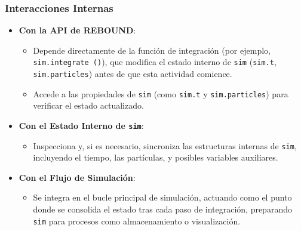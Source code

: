 \subsubsection{Interacciones Internas}
\begin{itemize}
    \item \textbf{Con la API de REBOUND}:
    \begin{itemize}
        \item Depende directamente de la función de integración (por ejemplo, \texttt{sim.integrate~()}), que modifica el estado interno de \texttt{sim} (\texttt{sim.t}, \texttt{sim.particles}) antes de que esta actividad comience.
        \item Accede a las propiedades de \texttt{sim} (como \texttt{sim.t} y \texttt{sim.particles}) para verificar el estado actualizado.
    \end{itemize}
    \item \textbf{Con el Estado Interno de \texttt{sim}}:
    \begin{itemize}
        \item Inspecciona y, si es necesario, sincroniza las estructuras internas de \texttt{sim}, incluyendo el tiempo, las partículas, y posibles variables auxiliares.
    \end{itemize}
    \item \textbf{Con el Flujo de Simulación}:
    \begin{itemize}
        \item Se integra en el bucle principal de simulación, actuando como el punto donde se consolida el estado tras cada paso de integración, preparando \texttt{sim} para procesos como almacenamiento o visualización.
    \end{itemize}
\end{itemize}
\newpage
